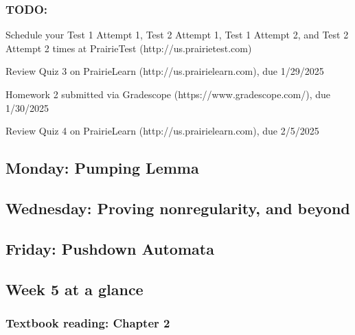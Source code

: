 \vspace{-20pt}

\subsubsection*{TODO:}
\begin{list}{\itemsep-10pt}
   \item Schedule your Test 1 Attempt 1, Test 2 Attempt 1, Test 1 Attempt 2, and Test 2 Attempt 2 times 
   at PrairieTest (http://us.prairietest.com)
   \item Review Quiz 3 on PrairieLearn (http://us.prairielearn.com), due 1/29/2025
   \item Homework 2 submitted via Gradescope (https://www.gradescope.com/), due 1/30/2025
   \item Review Quiz 4 on PrairieLearn (http://us.prairielearn.com), due 2/5/2025
\end{list}

\newpage
\subsection*{Monday: Pumping Lemma}



\newpage
\subsection*{Wednesday: Proving nonregularity, and beyond}


    
\newpage
\subsection*{Friday: Pushdown Automata}




\newpage

\subsection*{Week 5 at a glance}

\subsubsection*{Textbook reading: Chapter 2}

\vspace{-20pt}

